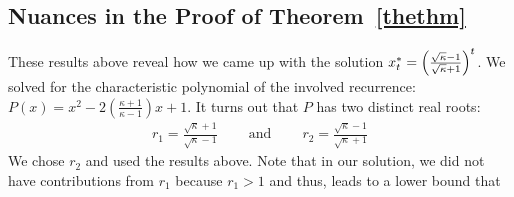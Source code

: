 \documentclass{article}
\begin{document}
\subsection*{Nuances in the Proof of Theorem~\ref{thethm}}
These results above reveal how we came up with the solution 
$
    {x}^{\ast}_t 
    = 
    \left(
        \frac{\sqrt{\kappa} - 1}{\sqrt{\kappa} + 1}
    \right)^t
$.
We solved for the characteristic polynomial of the involved recurrence: $P(x) = x^2 -2\left(\frac{\kappa + 1}{\kappa - 1}\right)x + 1$. 
It turns out that $P$ has two distinct real roots:
\begin{align*}
    r_1
    =
    \frac{
        \sqrt{\kappa} + 1
    }{
        \sqrt{\kappa} - 1
    }
    \qquad\ \text{and}\ \qquad
    r_2
    =
    \frac{
        \sqrt{\kappa} - 1
    }{
        \sqrt{\kappa} + 1
    }
\end{align*}
We chose $r_2$ and used the results above.
Note that in our solution, we did not have contributions from $r_1$ because $r_1 > 1$ and thus, leads to a lower bound that 
\end{document}
